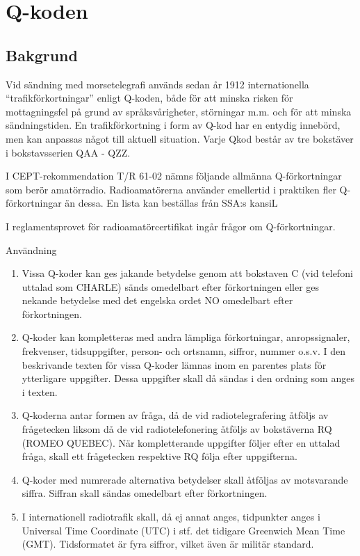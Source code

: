 \section{Q-koden}

\subsection{Bakgrund}

Vid sändning med morsetelegrafi används sedan år 1912 internationella
``trafikförkortningar'' enligt Q-koden, både för att minska risken för
mottagningsfel på grund av språksvårigheter, störningar m.m. och för
att minska sändningstiden. En trafikförkortning i form av Q-kod har en
entydig innebörd, men kan anpassas något till aktuell situation. Varje
Qkod består av tre bokstäver i bokstavsserien QAA - QZZ.

I CEPT-rekommendation T/R 61-02 nämns följande allmänna
Q-förkortningar som berör amatörradio.  Radioamatörerna använder
emellertid i praktiken fler Q-förkortningar än dessa. En lista kan
beställas från SSA:s kansiL

I reglamentsprovet för radioamatörcertifikat ingår frågor om Q-förkortningar.

Användning
\begin{enumerate}
\item Vissa Q-koder kan ges jakande betydelse genom att bokstaven C
  (vid telefoni uttalad som CHARLE) sänds omedelbart efter
  förkortningen eller ges nekande betydelse med det engelska ordet NO
  omedelbart efter förkortningen.
\item Q-koder kan kompletteras med andra lämpliga förkortningar,
  anropssignaler, frekvenser, tidsuppgifter, person- och ortsnamn,
  siffror, nummer o.s.v. I den beskrivande texten för vissa Q-koder
  lämnas inom en parentes plats för ytterligare uppgifter. Dessa
  uppgifter skall då sändas i den ordning som anges i texten.
\item Q-koderna antar formen av fråga, då de vid radiotelegrafering
  åtföljs av frågetecken liksom då de vid radiotelefonering åtföljs av
  bokstäverna RQ (ROMEO QUEBEC). När kompletterande uppgifter följer
  efter en uttalad fråga, skall ett frågetecken respektive RQ följa
  efter uppgifterna.
\item Q-koder med numrerade alternativa betydelser skall åtföljas av
  motsvarande siffra. Siffran skall sändas omedelbart efter
  förkortningen.
\item I internationell radiotrafik skall, då ej annat anges,
  tidpunkter anges i Universal Time Coordinate (UTC) i stf. det
  tidigare Greenwich Mean Time (GMT). Tidsformatet är fyra siffror,
  vilket även är militär standard.
\end{enumerate}

